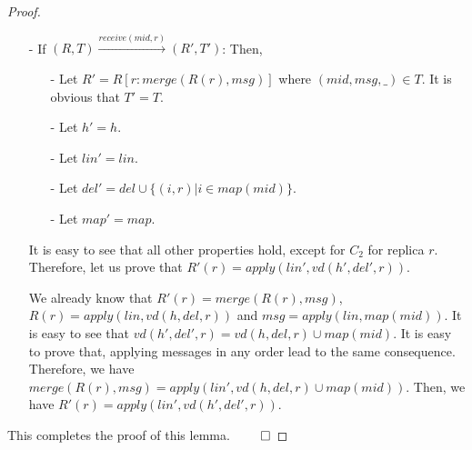 {\begin {proof}
\begin{itemize}
\begin{itemize}
    \item[-] Let $h' = h$.

    \item[-] Let $\mathit{lin}' = \mathit{lin}$.

    \item[-] Let $\mathit{del}' = \mathit{del}$.

    \item[-] Let $\mathit{map}' = \mathit{map} \cup \{ (\mathit{mid},\mathit{vd}(h,\mathit{del},r)) \}$.
    \end{itemize}

    It is easy to see that all other properties hold, except for checking $C_1$ for $\mathit{mid}$. This holds obviously since the message content of message $\mathit{mid}$ is $R(r)$, and we already know that $R(r) = \mathit{apply}(\mathit{lin},\mathit{vd}(h,\mathit{del},r)) = \mathit{apply}(\mathit{lin},\mathit{map}(\mathit{mid}))$.

\item[-] If $(R,T) {\xrightarrow{\mathit{receive}(\mathit{mid},r)}} (R',T')$: Then,

    \begin{itemize}
    \setlength{\itemsep}{0.5pt}
    \item[-] Let $R' = R[ r: \mathit{merge}(R(r),\mathit{msg})]$ where $(\mathit{mid},\mathit{msg},\_) \in T$. It is obvious that $T' = T$.

    \item[-] Let $h' = h$.

    \item[-] Let $\mathit{lin}' = \mathit{lin}$.

    \item[-] Let $\mathit{del}' = \mathit{del} \cup \{ (i,r) \vert i \in \mathit{map}(\mathit{mid}) \}$.

    \item[-] Let $\mathit{map}' = \mathit{map}$.
    \end{itemize}

    It is easy to see that all other properties hold, except for $C_2$ for replica $r$. Therefore, let us prove that $R'(r) = \mathit{apply}(\mathit{lin}',\mathit{vd}(h',\mathit{del}',r))$.

    We already know that $R'(r) = \mathit{merge}(R(r), \mathit{msg})$, $R(r) = \mathit{apply}(\mathit{lin},\mathit{vd}(h,\mathit{del},r))$ and $\mathit{msg} = \mathit{apply}(\mathit{lin},\mathit{map}(\mathit{mid}))$. It is easy to see that $\mathit{vd}(h',\mathit{del}',r) = \mathit{vd}(h,\mathit{del},r) \cup \mathit{map}(\mathit{mid})$. It is easy to prove that, applying messages in any order lead to the same consequence. Therefore, we have $\mathit{merge}(R(r), \mathit{msg}) = \mathit{apply}(\mathit{lin}',\mathit{vd}(h,\mathit{del},r) \cup \mathit{map}(\mathit{mid}))$. Then, we have $R'(r) = \mathit{apply}(\mathit{lin}',\mathit{vd}(h',\mathit{del}',r))$.
\end{itemize}

This completes the proof of this lemma. $\qed$
\end {proof}
}

